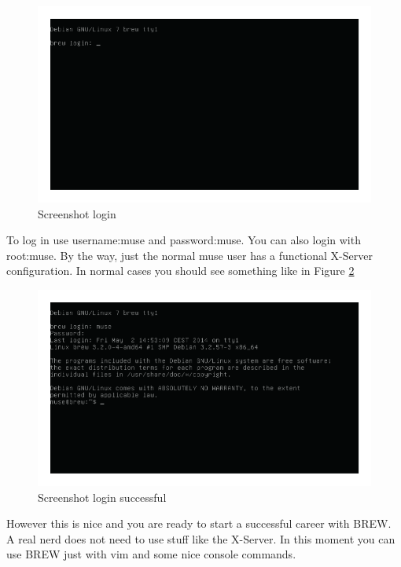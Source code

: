 \documentclass{llncs}%
\begin{document}
\begin{figure}
\centering
\includegraphics[width=1\textwidth]{screenshot_start}
\caption{Screenshot login} 
\label{fig:login}
\end{figure}

To log in use {\Tt{}username:muse\nwendquote} and {\Tt{}password:muse\nwendquote}. You can also login with {\Tt{}root:muse\nwendquote}. By the way, just the normal muse user has a functional X-Server configuration.
In normal cases you should see something like in Figure \ref{fig:loginsuc}

\begin{figure}
\centering
\includegraphics[width=1\textwidth]{screenshot_loggedin}
\caption{Screenshot login successful} 
\label{fig:loginsuc}
\end{figure}

However this is nice and you are ready to start a successful career with BREW. A real nerd does not need to use stuff like the X-Server. In this moment you can use BREW just with vim and some nice console commands.
\end{document}
